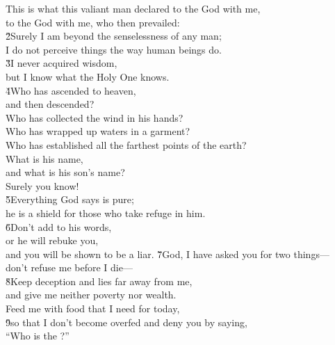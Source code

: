 \begin{poetry}
\poeml This is what this valiant man declared to the God with me, \\
\poemll    to the God with me, who then prevailed: \\
\poeml \v{2}Surely I am beyond the senselessness of any man; \\
\poemll    I do not perceive things the way human beings do. \\
\poeml \v{3}I never acquired wisdom, \\
\poemll    but I know what the Holy One knows. \\
\poeml \v{4}Who has ascended to heaven, \\
\poemll    and then descended? \\
\poemlll       Who has collected the wind in his hands? \\
\poeml Who has wrapped up waters in a garment? \\
\poemll    Who has established all the farthest points of the earth? \\
\poeml What is his name, \\
\poemll    and what is his son's name? \\
\poemlll       Surely you know! \\
\poeml \v{5}Everything God says is pure; \\
\poemll    he is a shield for those who take refuge in him. \\
\poeml \v{6}Don't add to his words, \\
\poemll    or he will rebuke you, \\
\poemlll       and you will be shown to be a liar.
\poeml \v{7}God, I have asked you for two things--- \\
\poemll    don't refuse me before I die--- \\
\poeml \v{8}Keep deception and lies far away from me, \\
\poemll    and give me neither poverty nor wealth. \\
\poeml Feed me with food that I need for today, \\
\poeml \v{9}so that I don't become overfed and deny you by saying, \\
\poemlll       ``Who is the ?'' \\

\end{poetry}
